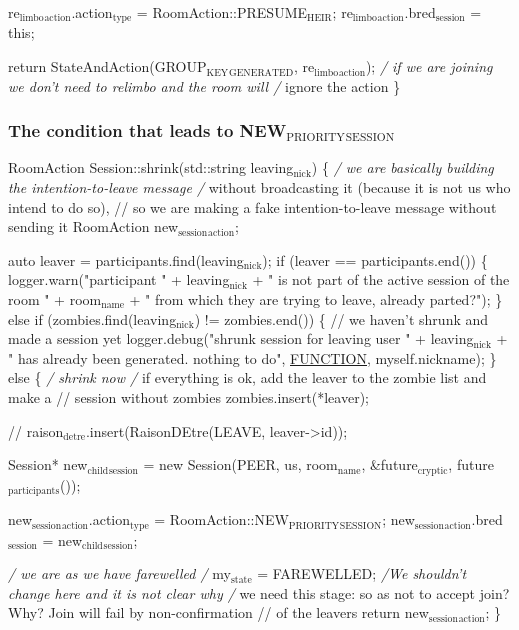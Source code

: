 \documentclass[11pt]{article}
\begin{document}
re$_{\text{limbo}}$$_{\text{action}}$.action$_{\text{type}}$ = RoomAction::PRESUME$_{\text{HEIR}}$;
re$_{\text{limbo}}$$_{\text{action}}$.bred$_{\text{session}}$ = this;

    return StateAndAction(GROUP$_{\text{KEY}}$$_{\text{GENERATED}}$, re$_{\text{limbo}}$$_{\text{action}}$);
    \emph{/ if we are joining we don't need to relimbo and the room will
    /} ignore the action
\}

\subsubsection{The condition that leads to NEW$_{\text{PRIORITY}}$$_{\text{SESSION}}$}
\label{sec-1-1-3}
RoomAction Session::shrink(std::string leaving$_{\text{nick}}$)
\{
 \emph{/ we are basically building the intention-to-leave message
 /} without broadcasting it (because it is not us who intend to do so),
 // so we are making a fake intention-to-leave message without sending it
 RoomAction new$_{\text{session}}$$_{\text{action}}$;

auto leaver = participants.find(leaving$_{\text{nick}}$);
if (leaver == participants.end()) \{
    logger.warn("participant " + leaving$_{\text{nick}}$ + " is not part of the active session of the room " + room$_{\text{name}}$ +
                " from which they are trying to leave, already parted?");
\} else if (zombies.find(leaving$_{\text{nick}}$) != zombies.end()) \{ // we haven't shrunk and made a session yet
    logger.debug("shrunk session for leaving user " + leaving$_{\text{nick}}$ + " has already been generated. nothing to do",
                 \uline{\uline{FUNCTION}}, myself.nickname);
\} else \{ \emph{/ shrink now
    /} if everything is ok, add the leaver to the zombie list and make a
    // session without zombies
    zombies.insert(*leaver);

// raison$_{\text{detre}}$.insert(RaisonDEtre(LEAVE, leaver->id));

Session* new$_{\text{child}}$$_{\text{session}}$ =
    new Session(PEER, us, room$_{\text{name}}$, \&future$_{\text{cryptic}}$, future$_{\text{participants}}$());

new$_{\text{session}}$$_{\text{action}}$.action$_{\text{type}}$ = RoomAction::NEW$_{\text{PRIORITY}}$$_{\text{SESSION}}$;
new$_{\text{session}}$$_{\text{action}}$.bred$_{\text{session}}$ = new$_{\text{child}}$$_{\text{session}}$;

    \emph{/ we are as we have farewelled
    /} my$_{\text{state}}$ = FAREWELLED; \emph{/We shouldn't change here and it is not clear why
    /} we need this stage: so as not to accept join? Why? Join will fail by non-confirmation
    // of the leavers
    return new$_{\text{session}}$$_{\text{action}}$;
\}
\end{document}
